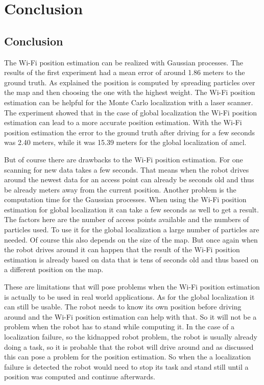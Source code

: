 \chapter{Conclusion} %
\label{Chapter5}

\section{Conclusion}
The Wi-Fi position estimation can be realized with Gaussian processes. The results of the first experiment had a mean error of around 1.86 meters to the ground truth. As explained the position is computed by spreading particles over the map and then choosing the one with the highest weight. 
The Wi-Fi position estimation can be helpful for the Monte Carlo localization with a laser scanner. The experiment showed that in the case of global localization the Wi-Fi position estimation can lead to a more accurate position estimation. With the Wi-Fi position estimation the error to the ground truth after driving for a few seconds was 2.40 meters, while it was 15.39 meters for the global localization of amcl. 

But of course there are drawbacks to the Wi-Fi position estimation. For one scanning for new data takes a few seconds. That means when the robot drives around the newest data for an access point can already be seconds old and thus be already meters away from the current position. Another problem is the computation time for the Gaussian processes. When using the Wi-Fi position estimation for global localization it can take a few seconds as well to get a result. The factors here are the number of access points available and the numbers of particles used. To use it for the global localization a large number of particles are needed. Of course this also depends on the size of the map. But once again when the robot drives around it can happen that the result of the Wi-Fi position estimation is already based on data that is tens of seconds old and thus based on a different position on the map. 

These are limitations that will pose problems when the Wi-Fi position estimation is actually to be used in real world applications. As for the global localization it can still be usable. The robot needs to know its own position before driving around and the Wi-Fi position estimation can help with that. So it will not be a problem when the robot has to stand while computing it. In the case of a localization failure, so the kidnapped robot problem, the robot is usually already doing a task, so it is probable that the robot will drive around and as discussed this can pose a problem for the position estimation. So when the a localization failure is detected the robot would need to stop its task and stand still until a position was computed and continue afterwards. 

